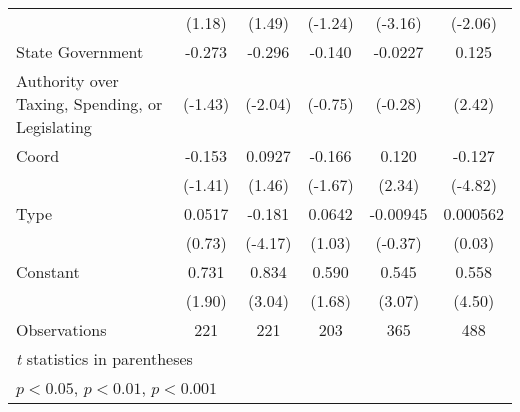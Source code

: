 {\begin{tabular}{l*{5}{c}}
                    &      (1.18)         &      (1.49)         &     (-1.24)         &     (-3.16)         &     (-2.06)         \\
[1em]
State Government    &      -0.273         &      -0.296\sym{*}  &      -0.140         &     -0.0227         &       0.125\sym{*}  \\
Authority over Taxing, Spending, or Legislating&     (-1.43)         &     (-2.04)         &     (-0.75)         &     (-0.28)         &      (2.42)         \\
[1em]
Coord               &      -0.153         &      0.0927         &      -0.166         &       0.120\sym{*}  &      -0.127\sym{***}\\
                    &     (-1.41)         &      (1.46)         &     (-1.67)         &      (2.34)         &     (-4.82)         \\
[1em]
Type                &      0.0517         &      -0.181\sym{***}&      0.0642         &    -0.00945         &    0.000562         \\
                    &      (0.73)         &     (-4.17)         &      (1.03)         &     (-0.37)         &      (0.03)         \\
[1em]
Constant            &       0.731         &       0.834\sym{**} &       0.590         &       0.545\sym{**} &       0.558\sym{***}\\
                    &      (1.90)         &      (3.04)         &      (1.68)         &      (3.07)         &      (4.50)         \\
\hline
Observations        &         221         &         221         &         203         &         365         &         488         \\
\hline\hline
\multicolumn{6}{l}{\footnotesize \textit{t} statistics in parentheses}\\
\multicolumn{6}{l}{\footnotesize \sym{*} \(p<0.05\), \sym{**} \(p<0.01\), \sym{***} \(p<0.001\)}\\
\end{tabular}
}

